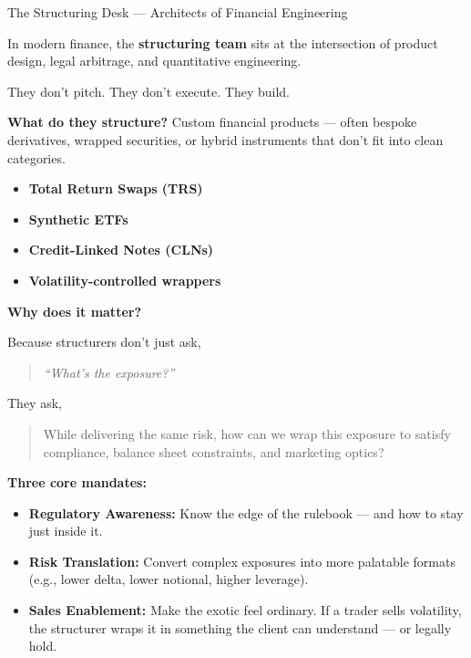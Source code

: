 \begin{TechnicalSidebar}{The Structuring Desk — Architects of Financial Engineering}

    In modern finance, the \textbf{structuring team} sits at the intersection of product design, 
    legal arbitrage, and quantitative engineering.
    
    They don’t pitch.  
    They don’t execute.  
    They build.
    
    \bigskip
    
    \textbf{What do they structure?}  
    Custom financial products — often bespoke derivatives, wrapped securities, or hybrid instruments 
    that don’t fit into clean categories.
    
    \begin{itemize}
      \item \textbf{Total Return Swaps (TRS)}
      \item \textbf{Synthetic ETFs}
      \item \textbf{Credit-Linked Notes (CLNs)}
      \item \textbf{Volatility-controlled wrappers}
    \end{itemize}
    
    \bigskip
    
    \textbf{Why does it matter?}
    
    Because structurers don’t just ask,  
    \begin{quote}
      \textit{“What’s the exposure?”}  
    \end{quote}
    They ask,  
    \begin{quote}
      While delivering the same risk,
      how can we wrap this exposure to satisfy compliance, balance sheet constraints, and 
      marketing optics?
    \end{quote}
    
    \bigskip
    
    \textbf{Three core mandates:}
    
    \begin{itemize}
      \item \textbf{Regulatory Awareness:}  
      Know the edge of the rulebook — and how to stay just inside it.
    
      \item \textbf{Risk Translation:}  
      Convert complex exposures into more palatable formats (e.g., lower delta, lower notional, higher leverage).
    
      \item \textbf{Sales Enablement:}  
      Make the exotic feel ordinary.  
      If a trader sells volatility, the structurer wraps it in something the client can understand — or legally hold.
    \end{itemize}
    

\end{TechnicalSidebar}
